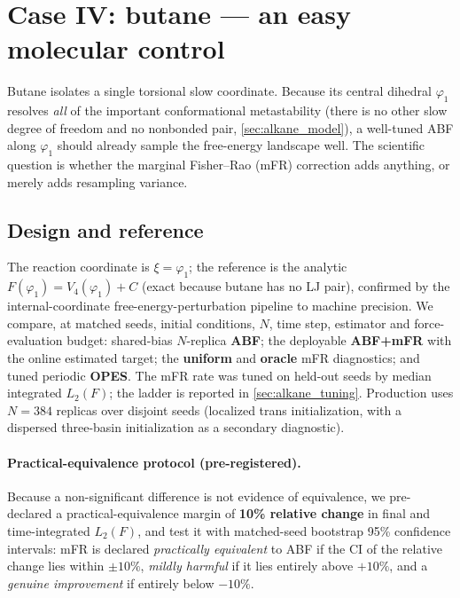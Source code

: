 \section{Case IV: butane --- an easy molecular control}
\label{sec:case_butane}

Butane isolates a single torsional slow coordinate. Because its central dihedral
$\varphi_1$ resolves \emph{all} of the important conformational metastability (there
is no other slow degree of freedom and no nonbonded pair, \cref{sec:alkane_model}),
a well-tuned ABF along $\varphi_1$ should already sample the free-energy landscape
well. The scientific question is whether the marginal Fisher--Rao (mFR) correction
adds anything, or merely adds resampling variance.

\subsection{Design and reference}
The reaction coordinate is $\xi=\varphi_1$; the reference is the analytic
$F(\varphi_1)=V_4(\varphi_1)+C$ (exact because butane has no LJ pair), confirmed by
the internal-coordinate free-energy-perturbation pipeline to machine precision. We
compare, at matched seeds, initial conditions, $N$, time step, estimator and
force-evaluation budget: shared-bias $N$-replica \textbf{ABF}; the deployable
\textbf{ABF+mFR} with the online estimated target; the \textbf{uniform} and
\textbf{oracle} mFR diagnostics; and tuned periodic \textbf{OPES}. The mFR rate was
tuned on held-out seeds by median integrated $L_2(F)$; the ladder is reported in
\cref{sec:alkane_tuning}. Production uses $N=384$ replicas over disjoint seeds
(localized trans initialization, with a dispersed three-basin initialization as a
secondary diagnostic).

\paragraph{Practical-equivalence protocol (pre-registered).} Because a
non-significant difference is not evidence of equivalence, we pre-declared a
practical-equivalence margin of \textbf{10\% relative change} in final and
time-integrated $L_2(F)$, and test it with matched-seed bootstrap 95\% confidence
intervals: mFR is declared \emph{practically equivalent} to ABF if the CI of the
relative change lies within $\pm10\%$, \emph{mildly harmful} if it lies entirely
above $+10\%$, and a \emph{genuine improvement} if entirely below $-10\%$.

